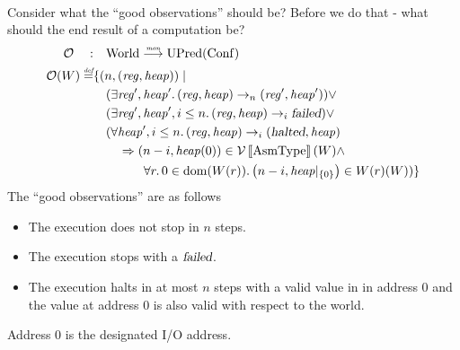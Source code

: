 \documentclass{article}
\newcommand{\update}[2]{[#1 \mapsto #2]}
\newcommand{\sem}[1]{\left\llbracket #1 \right\rrbracket}
\newcommand{\restrictfun}[1]{|_{#1}}
\newcommand{\monfun}{\stackrel{\textit{\tiny{mon}}}{\longrightarrow}}
\newcommand{\defeq}{\stackrel{\textit{\tiny{def}}}{=}}
\DeclareMathOperator{\dom}{dom}
\newcommand{\var}[1]{\mathit{#1}}
\newcommand{\pcreg}{\mathrm{pc}}
\newcommand{\addr}{\var{a}}
\newcommand{\start}{\var{base}}
\newcommand{\addrend}{\var{end}}
\newcommand{\reg}{\var{reg}}
\newcommand{\heap}{\var{heap}}
\newcommand{\plainproj}[1]{\mathrm{#1}}
\newcommand{\memheap}[1][\Phi]{#1.\plainproj{heap}}
\newcommand{\failed}{\textsl{failed}}
\newcommand{\halted}{\textsl{halted}}
\newcommand{\future}{\mathbin{\sqsupseteq}}
\newcommand{\heapSat}[3][\heap]{#1 :_{#2} #3}
\newcommand{\asmType}{\plaindom{AsmType}}
\newcommand{\plaindom}[1]{\mathrm{#1}}
\newcommand{\Confs}{\plaindom{Conf}}
\newcommand{\Worlds}{\plaindom{World}}
\newcommand{\UPred}[1]{\plaindom{UPred}(#1)}
\newcommand{\intr}[2]{\mathcal{#1}\sem{#2}}
\newcommand{\valueintr}[1]{\intr{V}{#1}}
\newcommand{\exprintr}[1]{\intr{E}{#1}}
\newcommand{\stdvr}{\valueintr{\asmType}}
\newcommand{\stder}{\exprintr{\asmType}}
\newcommand{\observations}{\mathcal{O}}
\newcommand{\npair}[2][n]{\left(#1,#2 \right)}
\newcommand{\plainperm}[1]{\mathrm{#1}}
\newcommand{\exec}{\plainperm{rx}}
\newcommand{\step}[1][]{\rightarrow_{#1}}
\begin{document}
\begin{align*}
\end{align*}

Consider what the ``good observations'' should be? Before we do that - what should the end result of a computation be?
\begin{align*}
  \observations \quad : & \quad  \Worlds \monfun \UPred{\Confs} \\
  \observations (W) \defeq & \{ \npair{(\reg,\heap)} \mid \\
                           & \quad (\exists \reg', \heap' \ldotp (\reg,\heap) \step[n] (\reg',\heap')) \lor \\ %
                           & \quad (\exists \reg', \heap', i \leq n \ldotp (\reg,\heap) \step[i] \failed) \lor \\
                           & \quad (\forall \heap', i \leq n \ldotp (\reg,\heap) \step[i] (\halted,\heap)  \\
                           & \qquad \Rightarrow \npair[n-i]{\heap(0)} \in \stdvr(W) \land \\
                           & \qquad \qquad \forall r \ldotp 0 \in \dom(W(r)) \ldotp \npair[n-i]{\heap \restrictfun{\{0\}}} \in W(r)(W) )\}
\end{align*}
The ``good observations'' are as follows
\begin{itemize}
\item The execution does not stop in $n$ steps. 
\item The execution stops with a $\failed$.
\item The execution halts in at most $n$ steps with a valid value in in address 0 and the value at address 0 is also valid with respect to the world.
\end{itemize}
Address 0 is the designated I/O address.
\end{document}
